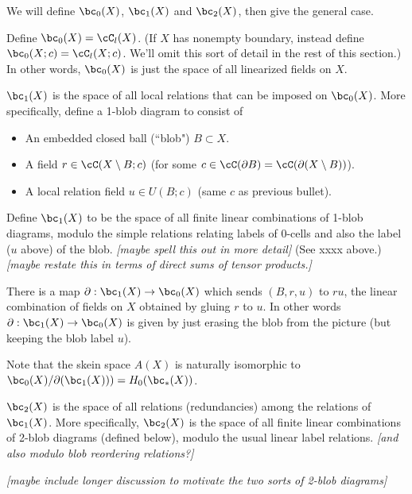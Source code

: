 \documentclass[11pt,leqno]{amsart}
\def\bd{\partial}
\def\sub{\subset}
\def\setmin{\setminus}
\def\nn#1{{{\it \small [#1]}}}
\begin{document}
We will define $\bc_0(X)$, $\bc_1(X)$ and $\bc_2(X)$, then give the general case.

Define $\bc_0(X) = \cC_l(X)$.
(If $X$ has nonempty boundary, instead define $\bc_0(X; c) = \cC_l(X; c)$.
We'll omit this sort of detail in the rest of this section.)
In other words, $\bc_0(X)$ is just the space of all linearized fields on $X$.

$\bc_1(X)$ is the space of all local relations that can be imposed on $\bc_0(X)$.
More specifically, define a 1-blob diagram to consist of
\begin{itemize}
\item An embedded closed ball (``blob") $B \sub X$.
\item A field $r \in \cC(X \setmin B; c)$
(for some $c \in \cC(\bd B) = \cC(\bd(X \setmin B))$).
\item A local relation field $u \in U(B; c)$
(same $c$ as previous bullet).
\end{itemize}
Define $\bc_1(X)$ to be the space of all finite linear combinations of
1-blob diagrams, modulo the simple relations relating labels of 0-cells and
also the label ($u$ above) of the blob.
\nn{maybe spell this out in more detail}
(See xxxx above.)
\nn{maybe restate this in terms of direct sums of tensor products.}

There is a map $\bd : \bc_1(X) \to \bc_0(X)$ which sends $(B, r, u)$ to $ru$, the linear
combination of fields on $X$ obtained by gluing $r$ to $u$.
In other words $\bd : \bc_1(X) \to \bc_0(X)$ is given by
just erasing the blob from the picture
(but keeping the blob label $u$).

Note that the skein space $A(X)$
is naturally isomorphic to $\bc_0(X)/\bd(\bc_1(X))) = H_0(\bc_*(X))$.

$\bc_2(X)$ is the space of all relations (redundancies) among the relations of $\bc_1(X)$.
More specifically, $\bc_2(X)$ is the space of all finite linear combinations of
2-blob diagrams (defined below), modulo the usual linear label relations.
\nn{and also modulo blob reordering relations?}

\nn{maybe include longer discussion to motivate the two sorts of 2-blob diagrams}
\end{document}

